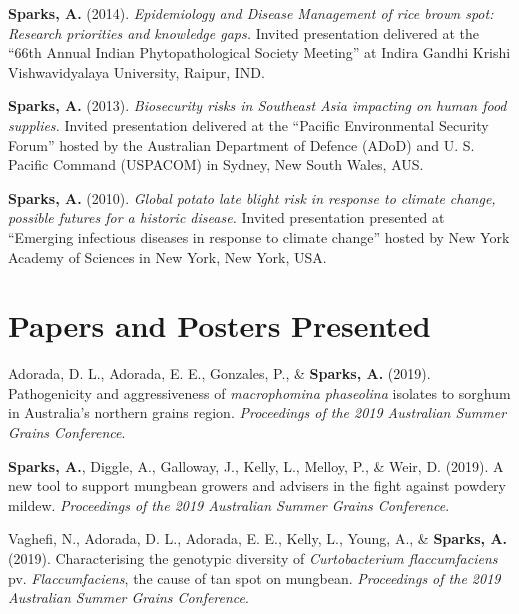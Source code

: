 \documentclass[11pt, a4paper]{awesome-cv}
\begin{document}
\textbf{Sparks, A.} (2014). \emph{Epidemiology and Disease Management of rice brown spot: Research priorities and knowledge gaps.} Invited presentation delivered at the ``66th Annual Indian Phytopathological Society Meeting'' at Indira Gandhi Krishi Vishwavidyalaya University, Raipur, IND.

\textbf{Sparks, A.} (2013). \emph{Biosecurity risks in Southeast Asia impacting on human food supplies.} Invited presentation delivered at the ``Pacific Environmental Security Forum'' hosted by the Australian Department of Defence (ADoD) and U. S. Pacific Command (USPACOM) in Sydney, New South Wales, AUS.

\textbf{Sparks, A.} (2010). \emph{Global potato late blight risk in response to climate change, possible futures for a historic disease.} Invited presentation presented at ``Emerging infectious diseases in response to climate change'' hosted by New York Academy of Sciences in New York, New York, USA.

\endgroup

\hypertarget{papers-and-posters-presented}{%
\section{Papers and Posters Presented}\label{papers-and-posters-presented}}

\begingroup
\setlength{\parindent}{-0.5in}
\setlength{\leftskip}{0.5in}

\hypertarget{refs_proceedings}{}
\leavevmode\hypertarget{ref-Adorada2019}{}%
Adorada, D. L., Adorada, E. E., Gonzales, P., \& \textbf{Sparks, A.} (2019). Pathogenicity and aggressiveness of \emph{macrophomina phaseolina} isolates to sorghum in Australia's northern grains region. \emph{Proceedings of the 2019 Australian Summer Grains Conference}.

\leavevmode\hypertarget{ref-Sparks2019ASGC}{}%
\textbf{Sparks, A.}, Diggle, A., Galloway, J., Kelly, L., Melloy, P., \& Weir, D. (2019). A new tool to support mungbean growers and advisers in the fight against powdery mildew. \emph{Proceedings of the 2019 Australian Summer Grains Conference}.

\leavevmode\hypertarget{ref-Vaghefi2019}{}%
Vaghefi, N., Adorada, D. L., Adorada, E. E., Kelly, L., Young, A., \& \textbf{Sparks, A.} (2019). Characterising the genotypic diversity of \emph{Curtobacterium flaccumfaciens} pv. \emph{Flaccumfaciens}, the cause of tan spot on mungbean. \emph{Proceedings of the 2019 Australian Summer Grains Conference}.
\end{document}
